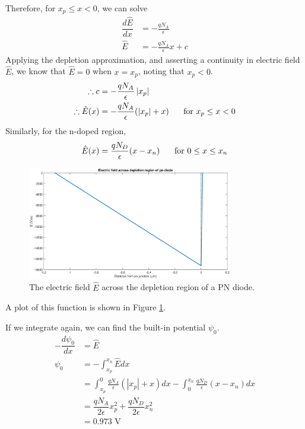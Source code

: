 	Therefore, for $x_p \le x < 0$, we can solve
	\[
	\begin{aligned}
		\dfrac{d\hat{E}}{dx} &= -\frac{q N_A}{\epsilon} \\
					\hat{E}	 &= -\frac{q N_A}{\epsilon} x + c
	\end{aligned}
	\]
	Applying the depletion approximation, and asserting a continuity in electric field $\hat{E}$, we know that $\hat{E} = 0$ when $x = x_p$, noting that $x_p < 0$.
	\[
	\begin{aligned}
		\therefore c &= - \dfrac{q N_A}{\epsilon}\left|x_p\right| \\
		\therefore \hat{E}(x) &= - \dfrac{q N_A}{\epsilon}(\left|x_p\right| + x) \textrm{\hspace{0.5cm} for } x_p \le x < 0
	\end{aligned}
	\]
	Similarly, for the n-doped region,
	$$ \hat{E}(x) = \dfrac{q N_D}{\epsilon}(x -x_n) \textrm{\hspace{0.5cm} for } 0 \le x \le x_n$$
	\begin{figure}[!htbp]
		\centering
		\includegraphics[width=0.8\textwidth]{./img/2c_E}
		\caption{The electric field $\hat{E}$ across the depletion region of a PN diode.}
		\label{fig::e_field}
	\end{figure}	
	A plot of this function is shown in Figure \ref{fig::e_field}.
	
	If we integrate again, we can find the built-in potential $\psi_0$.
	\[
	\begin{aligned}
		- \dfrac{d \psi_0}{dx} &= \hat{E} \\
		\psi_0 &= - \int_{x_p}^{x_n} \hat{E} dx \\
			   &= 
			   \int_{x_p}^{0} \frac{q N_A}{\epsilon} (\left|x_p\right|+x) dx 
			   - \int_{0}^{x_n} \frac{q N_D}{\epsilon} (x - x_n) dx \\
			   &= \dfrac{q N_A}{2 \epsilon} x_p^2 + \dfrac{q N_D}{2 \epsilon} x_n^2 \\
			   &= 0.973 \textrm{ V}
	\end{aligned}
	\]
	
